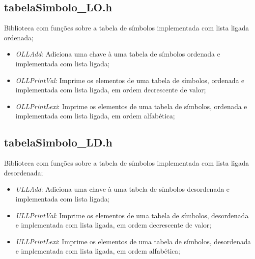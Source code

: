 \documentclass[12pt, a4paper]{article} %
\begin{document}
	\subsection{tabelaSimbolo\_LO.h}
	Biblioteca com funções sobre a tabela de símbolos implementada com lista ligada ordenada;
	\begin{itemize}
		\item \textit{OLLAdd}: Adiciona uma chave à uma tabela de símbolos ordenada e implementada com lista ligada;
		\item \textit{OLLPrintVal}: Imprime os elementos de uma tabela de símbolos, ordenada e implementada com lista ligada, em ordem decrescente de valor;
		\item \textit{OLLPrintLexi}: Imprime os elementos de uma tabela de símbolos, ordenada e implementada com lista ligada, em ordem alfabética; 
	\end{itemize}

	\subsection{tabelaSimbolo\_LD.h}
	Biblioteca com funções sobre a tabela de símbolos implementada com lista ligada desordenada;
	\begin{itemize}
		\item \textit{ULLAdd}: Adiciona uma chave à uma tabela de símbolos desordenada e implementada com lista ligada;
		\item \textit{ULLPrintVal}: Imprime os elementos de uma tabela de símbolos, desordenada e implementada com lista ligada, em ordem decrescente de valor;
		\item \textit{ULLPrintLexi}: Imprime os elementos de uma tabela de símbolos, desordenada e implementada com lista ligada, em ordem alfabética; 
	\end{itemize}
\end{document}
